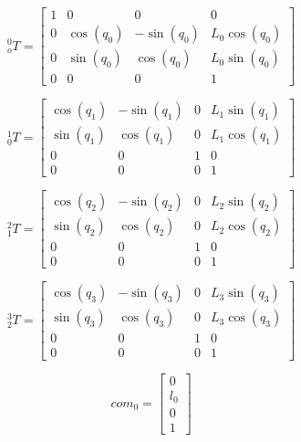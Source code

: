 \documentclass{article}
\begin{document}
\begin{equation}
	{}_o^0 T = \begin{bmatrix}
	1 & 0 & 0 & 0\\
	0 & \cos{(q_{0} )} & - \sin{(q_{0} )} & L_{0} \cos{(q_{0} )}\\
	0 & \sin{(q_{0} )} & \cos{(q_{0} )} & L_{0} \sin{(q_{0} )}\\
	0 & 0 & 0 & 1
\end{bmatrix}
\end{equation}

\begin{equation}
	{}_0^1 T = \begin{bmatrix}
	\cos{(q_{1} )} & - \sin{(q_{1} )} & 0 & L_{1} \sin{(q_{1} )}\\
	\sin{(q_{1} )} & \cos{(q_{1} )} & 0 & L_{1} \cos{(q_{1} )}\\
	0 & 0 & 1 & 0\\
	0 & 0 & 0 & 1
\end{bmatrix}
\end{equation}

\begin{equation}
	{}_1^2 T = \begin{bmatrix}
 	\cos{(q_{2} )} & - \sin{(q_{2} )} & 0 & L_{2} \sin{(q_{2} )}\\
 	\sin{(q_{2} )} & \cos{(q_{2} )} & 0 & L_{2} \cos{(q_{2} )}\\
 	0 & 0 & 1 & 0\\
 	0 & 0 & 0 & 1
\end{bmatrix}
\end{equation}

\begin{equation}
	{}_2^3 T = \begin{bmatrix}
 	\cos{(q_{3} )} & - \sin{(q_{3} )} & 0 & L_{3} \sin{(q_{3} )}\\
 	\sin{(q_{3} )} & \cos{(q_{3} )} & 0 & L_{3} \cos{(q_{3} )}\\
 	0 & 0 & 1 & 0\\
 	0 & 0 & 0 & 1
\end{bmatrix}
\end{equation}


\begin{equation}
	com_0 = \begin{bmatrix}
 	0\\
 	l_{0}\\
 	0\\
 	1
\end{bmatrix}
\end{equation}
\end{document}
